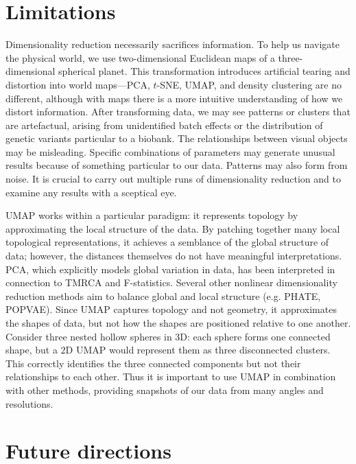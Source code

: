 \section{Limitations}

Dimensionality reduction necessarily sacrifices information. To help us navigate the physical world, we use two-dimensional Euclidean maps of a three-dimensional spherical planet. This transformation introduces artificial tearing and distortion into world maps---PCA, $t$-SNE, UMAP, and density clustering are no different, although with maps there is a more intuitive understanding of how we distort information. After transforming data, we may see patterns or clusters that are artefactual, arising from unidentified batch effects or the distribution of genetic variants particular to a biobank. The relationships between visual objects may be misleading. Specific combinations of parameters may generate unusual results because of something particular to our data. Patterns may also form from noise. It is crucial to carry out multiple runs of dimensionality reduction and to examine any results with a sceptical eye. 

UMAP works within a particular paradigm: it represents topology by approximating the local structure of the data. By patching together many local topological representations, it achieves a semblance of the global structure of data; however, the distances themselves do not have meaningful interpretations. PCA, which explicitly models global variation in data, has been interpreted in connection to TMRCA and F-statistics\citep{mcvean2009genealogical,peter_geometric_2022}. Several other nonlinear dimensionality reduction methods aim to balance global and local structure (e.g. PHATE\citep{moon2019visualizing}, POPVAE\citep{battey_visualizing_2021}). Since UMAP captures topology and not geometry, it approximates the shapes of data, but not how the shapes are positioned relative to one another. Consider three nested hollow spheres in $3$D: each sphere forms one connected shape, but a $2$D UMAP would represent them as three disconnected clusters\citep{herrmann_enhancing_2022}. This correctly identifies the three connected components but not their relationships to each other. Thus it is important to use UMAP in combination with other methods, providing snapshots of our data from many angles and resolutions.

\section{Future directions}

